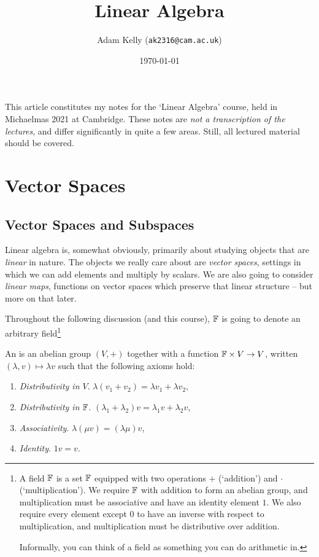 \documentclass[a4paper]{scrartcl}
\title{Linear Algebra}
\author{Adam Kelly (\texttt{ak2316@cam.ac.uk})}
\date{\today}
\begin{document}
\maketitle


This article constitutes my notes for the `Linear Algebra' course, held in Michaelmas 2021 at Cambridge. These notes are \emph{not a transcription of the lectures}, and differ significantly in quite a few areas. Still, all lectured material should be covered.



\tableofcontents

\section{Vector Spaces}

\subsection{Vector Spaces and Subspaces}

Linear algebra is, somewhat obviously, primarily about studying objects that are \emph{linear} in nature. The objects we really care about are \emph{vector spaces}, settings in which we can add elements and multiply by scalars. We are also going to consider \emph{linear maps}, functions on vector spaces which preserve that linear structure -- but more on that later. 

Throughout the following discussion (and this course), $\mathbb{F}$ is going to denote an arbitrary field\footnote{A field $\mathbb{F}$ is a set $\mathbb{F}$ equipped with two operations $+$ (`addition') and $\cdot$ (`multiplication'). We require $\mathbb{F}$ with addition to form an abelian group, and multiplication must be associative and have an identity element $1$. We also require every element except $0$ to have an inverse with respect to multiplication, and multiplication must be distributive over addition.

Informally, you can think of a field as something you can do arithmetic in.}

\begin{definition}
    An  is an abelian group $(V, +)$ together with a function $\mathbb{F} \times V \rightarrow V$, written $(\lambda, v) \mapsto \lambda v$ such that the following axioms hold:
    \begin{enumerate}[label=(\roman*)]
        \item \emph{Distributivity in $V$}. $\lambda(v_1 + v_2) = \lambda v_1 + \lambda v_2$,
        \item \emph{Distributivity in $\mathbb{F}$}. $(\lambda_1 + \lambda_2)v = \lambda_1 v + \lambda_2 v$,
        \item \emph{Associativity}. $\lambda(\mu v) = (\lambda \mu) v$,
        \item \emph{Identity}. $1v = v$.
    \end{enumerate} 
\end{definition}
\end{document}
